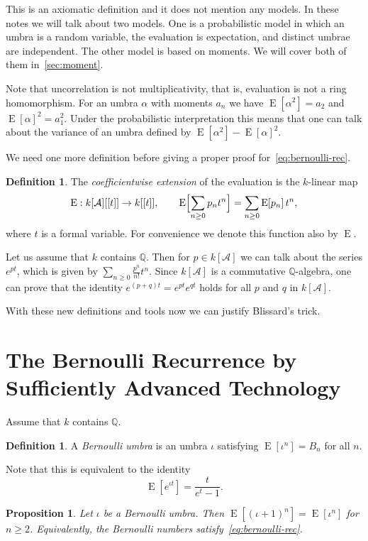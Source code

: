 \documentclass[11pt,a4paper]{report}
\theoremstyle{plain}
\newtheorem{proposition}[theorem]{Proposition}
\theoremstyle{definition}
\newtheorem{definition}[theorem]{Definition}
\theoremstyle{remark}
\newcommand{\E}{\operatorname{E}}
\newcommand{\QQ}{\mathbb{Q}}
\begin{document}
This is an axiomatic definition and it does not mention any models. In these notes we will talk about two models.
One is a probabilistic model in which an umbra is a random variable, the evaluation is expectation,
and distinct umbrae are independent. The other model is based on moments. We will cover both of them in~\ref{sec:moment}.

Note that uncorrelation is not multiplicativity, that is, evaluation is not a ring homomorphism. For an umbra $\alpha$
with moments $a_n$ we have $\E[\alpha^2] = a_2$ and $\E[\alpha]^2 = a_1^2$. Under the probabilistic interpretation this means
that one can talk about the variance of an umbra defined by $\E[\alpha^2] - \E[\alpha]^2$.

We need one more definition before giving a proper proof for~\eqref{eq:bernoulli-rec}.

\begin{definition}
\label{def:gf}
The \emph{coefficientwise extension} of the evaluation is the $k$-linear map
\[
  \E : k[\mathcal{A}][[t]] \to k[[t]] ,
  \qquad
  \E\Bigl[\sum_{n \geq 0} p_n t^n\Bigr] = \sum_{n \geq 0} \E[p_n]\, t^n ,
\]
where $t$ is a formal variable. For convenience we denote this function also by $\E$.
\end{definition}

Let us assume that $k$ contains $\QQ$. Then for $p \in k[\mathcal{A}]$ we can talk about the series $e^{pt}$,
which is given by $\sum_{n \geq 0} \frac{p^n}{n!}t^n$. Since $k[\mathcal{A}]$ is a commutative $\QQ$-algebra, 
one can prove that the identity $e^{(p+q)t} = e^{pt}e^{qt}$ holds for all $p$ and $q$ in $k[\mathcal{A}]$.

With these new definitions and tools now we can justify Blissard's trick. 

\section{The Bernoulli Recurrence by Sufficiently Advanced Technology}
\label{sec:bernoulli}
Assume that $k$ contains $\QQ$.

\begin{definition}
\label{def:bernoulli}
A \emph{Bernoulli umbra} is an umbra $\iota$ satisfying $\E[\iota^n] = B_n$ for all $n$.
\end{definition}

Note that this is equivalent to the identity 
\[
  \E[e^{\iota t}] = \frac{t}{e^t - 1} .
\]

\begin{proposition}
\label{prop:bernoulli-rec}
Let $\iota$ be a Bernoulli umbra. Then $\E[(\iota+1)^n] = \E[\iota^n]$ for
$n \geq 2$. Equivalently, the Bernoulli numbers satisfy~\eqref{eq:bernoulli-rec}.
\end{proposition}
\end{document}
